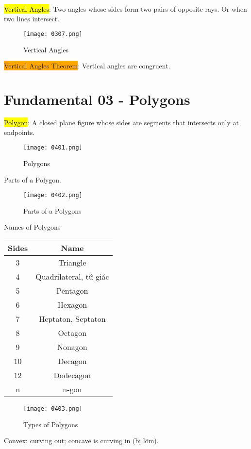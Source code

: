 \vspace{1 cm}

\hl{Vertical Angles}: Two angles whose sides form two pairs of opposite rays. Or when two lines intersect.

\begin{figure}[htb!]
  \centering
  \texttt{[image: 0307.png]}
  \caption{Vertical Angles}
\end{figure}

\begin{tcolorbox}[colback=red!5!white,colframe=red!75!black]
  \colorbox{Orange}{Vertical Angles Theorem}: Vertical angles are congruent.
\end{tcolorbox}

\section{Fundamental 03 - Polygons}

\hl{Polygon}: A closed plane figure whose sides are segments that intersects only at endpoints.

\begin{figure}[htb!]
  \centering
  \texttt{[image: 0401.png]}
  \caption{Polygons}
\end{figure}

Parts of a Polygon.

\begin{figure}[htb!]
  \centering
  \texttt{[image: 0402.png]}
  \caption{Parts of a Polygons}
\end{figure}

Names of Polygons

\begin{center}
\begin{tabular}{ c | c }
  \textbf{Sides} & \textbf{Name} \\
  \hline
  3 & Triangle \\
  4 & Quadrilateral, tứ giác \\
  5 & Pentagon \\
  6 & Hexagon \\
  7 & Heptaton, Septaton \\
  8 & Octagon \\
  9 & Nonagon \\
  10 & Decagon \\
  12 & Dodecagon \\
  n & n-gon \\
\end{tabular}
\end{center}

\begin{figure}[htb!]
  \centering
  \texttt{[image: 0403.png]}
  \caption{Types of Polygons}
\end{figure}

Convex: curving out; concave is curving in (bị lõm).

